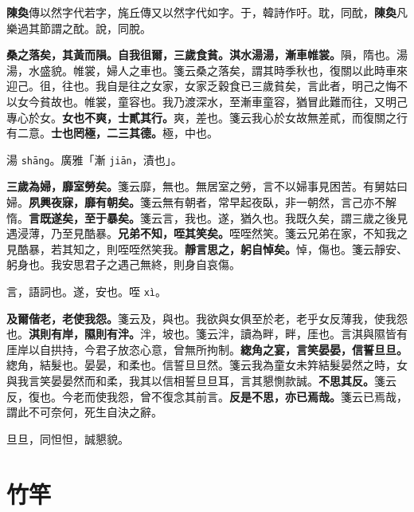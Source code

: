 \begin{quoting}\textbf{陳奐}傳以然字代若字，旄丘傳又以然字代如字。于，韓詩作吁。耽，同酖，\textbf{陳奐}凡樂過其節謂之酖。說，同脫。\end{quoting}

\textbf{桑之落矣，其黃而隕。自我徂爾，三歲食貧。淇水湯湯，漸車帷裳。}{\footnotesize 隕，隋也。湯湯，水盛貌。帷裳，婦人之車也。箋云桑之落矣，謂其時季秋也，復關以此時車來迎己。徂，往也。我自是往之女家，女家乏穀食已三歲貧矣，言此者，明己之悔不以女今貧故也。帷裳，童容也。我乃渡深水，至漸車童容，猶冒此難而往，又明己專心於女。}\textbf{女也不爽，士貳其行。}{\footnotesize 爽，差也。箋云我心於女故無差貳，而復關之行有二意。}\textbf{士也罔極，二三其德。}{\footnotesize 極，中也。}

\begin{quoting}湯 \texttt{shāng}。廣雅「漸 \texttt{jiān}，漬也」。\end{quoting}

\textbf{三歲為婦，靡室勞矣。}{\footnotesize 箋云靡，無也。無居室之勞，言不以婦事見困苦。有舅姑曰婦。}\textbf{夙興夜寐，靡有朝矣。}{\footnotesize 箋云無有朝者，常早起夜臥，非一朝然，言己亦不解惰。}\textbf{言既遂矣，至于暴矣。}{\footnotesize 箋云言，我也。遂，猶久也。我既久矣，謂三歲之後見遇浸薄，乃至見酷暴。}\textbf{兄弟不知，咥其笑矣。}{\footnotesize 咥咥然笑。箋云兄弟在家，不知我之見酷暴，若其知之，則咥咥然笑我。}\textbf{靜言思之，躬自悼矣。}{\footnotesize 悼，傷也。箋云靜安、躬身也。我安思君子之遇己無終，則身自哀傷。}

\begin{quoting}言，語詞也。遂，安也。咥 \texttt{xì}。\end{quoting}

\textbf{及爾偕老，老使我怨。}{\footnotesize 箋云及，與也。我欲與女俱至於老，老乎女反薄我，使我怨也。}\textbf{淇則有岸，隰則有泮。}{\footnotesize 泮，坡也。箋云泮，讀為畔，畔，厓也。言淇與隰皆有厓岸以自拱持，今君子放恣心意，曾無所拘制。}\textbf{緫角之宴，言笑晏晏，信誓旦旦。}{\footnotesize 緫角，結髮也。晏晏，和柔也。信誓旦旦然。箋云我為童女未筓結髮晏然之時，女與我言笑晏晏然而和柔，我其以信相誓旦旦耳，言其懇惻款誠。}\textbf{不思其反。}{\footnotesize 箋云反，復也。今老而使我怨，曾不復念其前言。}\textbf{反是不思，亦已焉哉。}{\footnotesize 箋云已焉哉，謂此不可奈何，死生自決之辭。}

\begin{quoting}旦旦，同怛怛，誠懇貌。\end{quoting}

\section{竹竿}

